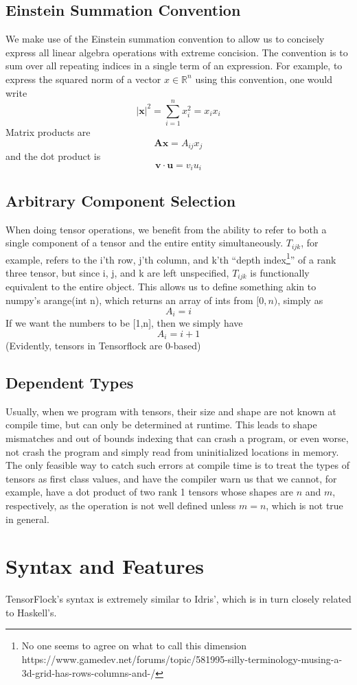 \documentclass[12pt]{article}
\begin{document}
\subsection{Einstein Summation Convention}
We make use of the Einstein summation convention to allow us to concisely
express all linear algebra operations with extreme concision. The convention
is to sum over all repeating indices in a single term of an expression. For
example, to express the squared norm of a vector $x \in \mathbb{R}^n$ using
this convention, one would write \[ |\mathbf{x} |^2 = \sum_{i=1}^{n} x_i^2
= x_i x_i\] Matrix products are \[\mathbf{Ax} = A_{ij}x_{j}\] and the dot
product is \[\mathbf{v} \cdot \mathbf{u} = v_i u_i\]
\subsection{Arbitrary Component Selection}
When doing tensor operations, we benefit from the ability to refer to both a single component 
of a tensor and the entire entity simultaneously. $T_{ijk}$, for example, refers to the i'th row, j'th column,  and k'th ``depth index\footnote{No one seems to agree on what to call this dimension https://www.gamedev.net/forums/topic/581995-silly-terminology-musing-a-3d-grid-has-rows-columns-and-/}'' of a rank three tensor, but since i, j, and k are left unspecified, $T_{ijk}$ is functionally equivalent to the entire object. This allows us to define something akin to numpy's arange(int n), which returns an array of ints from $[0,n)$, simply as \[A_i = i\] If we want the numbers to be [1,n], then we simply have 
\[A_i = i+1\]
(Evidently, tensors in Tensorflock are 0-based)
\subsection{Dependent Types}
Usually, when we program with tensors, their size and shape are not known at compile time, but can only be determined at runtime. This leads to shape mismatches and out of bounds indexing that can crash a program, or even worse, not crash the program and simply read from uninitialized locations in memory. The only feasible way to catch such errors at compile time is to treat the types of tensors as first class values, and have the compiler warn us that we cannot, for example, have a dot product of two rank 1 tensors whose shapes are $n$ and $m$, respectively, as the operation is not well defined unless $m=n$, which is not true in general. 
\section{Syntax and Features}
TensorFlock's syntax is extremely similar to Idris', which is in turn closely related to Haskell's. 
\end{document}
